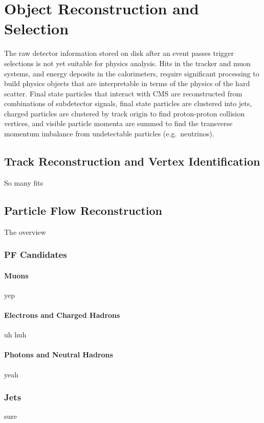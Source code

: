 \chapter{Object Reconstruction and Selection}

The raw detector information stored on disk after an event passes trigger selections is not yet suitable for physics analysis.
Hits in the tracker and muon systems, and energy deposits in the calorimeters, require significant processing to build physics objects that are interpretable in terms of the physics of the hard scatter.
Final state particles that interact with CMS are reconstructed from combinations of subdetector signals, final state particles are clustered into jets, charged particles are clustered by track origin to find proton-proton collision vertices, and visible particle momenta are summed to find the transverse momentum imbalance from undetectable particles (e.g.\ neutrinos).



\section{Track Reconstruction and Vertex Identification}
So many fits



\section{Particle Flow Reconstruction}
The overview

\subsection{PF Candidates}

\subsubsection{Muons}
yep

\subsubsection{Electrons and Charged Hadrons}
uh huh

\subsubsection{Photons and Neutral Hadrons}
yeah


\subsection{Jets}
sure


